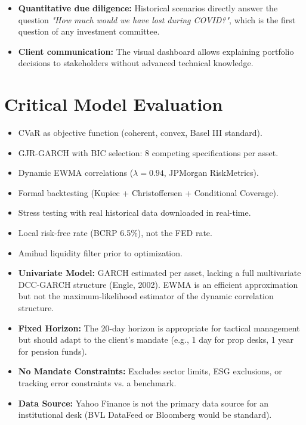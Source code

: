 \documentclass[11pt,a4paper]{article}
\begin{document}
\begin{itemize}[leftmargin=*]
    \item \textbf{Quantitative due diligence:} Historical scenarios directly answer
    the question \textit{"How much would we have lost during COVID?"}, which is the first question
    of any investment committee.
    \item \textbf{Client communication:} The visual dashboard allows explaining portfolio
    decisions to stakeholders without advanced technical knowledge.
\end{itemize}

\section{Critical Model Evaluation}

\begin{infobox}[Strengths]
\begin{itemize}[leftmargin=*, topsep=0pt]
    \item CVaR as objective function (coherent, convex, Basel III standard).
    \item GJR-GARCH with BIC selection: 8 competing specifications per asset.
    \item Dynamic EWMA correlations ($\lambda=0.94$, JPMorgan RiskMetrics).
    \item Formal backtesting (Kupiec + Christoffersen + Conditional Coverage).
    \item Stress testing with real historical data downloaded in real-time.
    \item Local risk-free rate (BCRP 6.5\%), not the FED rate.
    \item Amihud liquidity filter prior to optimization.
\end{itemize}
\end{infobox}

\begin{infobox}
\begin{itemize}[leftmargin=*, topsep=0pt]
    \item \textbf{Univariate Model:} GARCH estimated per asset, lacking a full multivariate
    DCC-GARCH structure (Engle, 2002). EWMA is an efficient approximation but not
    the maximum-likelihood estimator of the dynamic correlation structure.
    \item \textbf{Fixed Horizon:} The 20-day horizon is appropriate for tactical management
    but should adapt to the client's mandate (e.g., 1 day for prop desks,
    1 year for pension funds).
    \item \textbf{No Mandate Constraints:} Excludes sector limits, ESG exclusions,
    or tracking error constraints vs. a benchmark.
    \item \textbf{Data Source:} Yahoo Finance is not the primary data source for
    an institutional desk (BVL DataFeed or Bloomberg would be standard).
\end{itemize}
\end{infobox}
\end{document}
